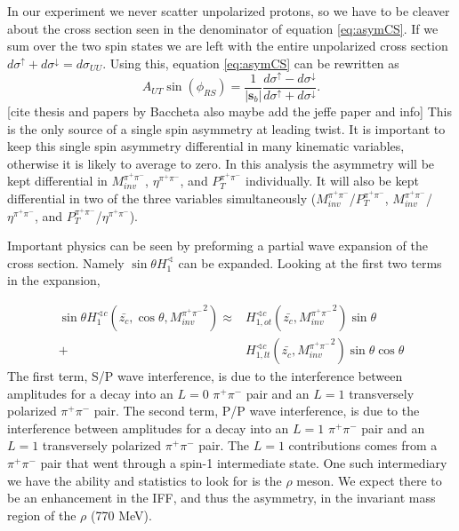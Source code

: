 \documentclass[abstract = on,listof=totoc, bibliography=totoc]{scrreprt}
\newcommand{\phirs}{\phi_{RS}}
\newcommand{\ptpair}{P_{T}^{\pi^+\pi^-}}
\newcommand{\mpair}{M_{inv}^{\pi^+\pi^-}}
\newcommand{\etapair}{\eta^{\pi^+\pi^-}}
\newcommand{\pip}{\pi^+}
\newcommand{\pim}{\pi^-}
\newcommand{\pair}{$\pip\pim$ }
\begin{document}
In our experiment we never scatter unpolarized protons, so we have to be cleaver about the cross section seen in the denominator of equation \ref{eq:asymCS}. If we sum over the two spin states we are left with the entire unpolarized cross section $d\sigma^\uparrow + d\sigma^\downarrow = d\sigma_{UU}$. Using this, equation \ref{eq:asymCS} can be rewritten as 
\begin{equation}
\label{eq:SSA}
A_{UT} \sin (\phirs) =\frac{1}{|\bm{s}_b|} \frac{d\sigma^\uparrow - d\sigma^\downarrow}{d\sigma^\uparrow + d\sigma^\downarrow}.
\end{equation}
[cite thesis and papers by Baccheta also maybe add the jeffe paper and info] 
This is the only source of a single spin asymmetry at leading twist.\cite{bacchettaRadici2} It is important to keep this single spin asymmetry differential in many kinematic variables, otherwise it is likely to average to zero\cite{keepDifferential}. In this analysis the asymmetry will be kept differential in $\mpair$, $\etapair$, and $\ptpair$ individually. It will also be kept differential in two of the three variables simultaneously ($\mpair$/$\ptpair$, $\mpair$/$\etapair$, and $\ptpair$/$\etapair$). 

Important physics can be seen by preforming a partial wave expansion of the cross section\cite{partialWave}. Namely $\sin \theta H_1^\sphericalangle$ can be expanded. Looking at the first two terms in the expansion, 


\begin{align}
\label{eq:partialwaveexpansion}
\sin \theta H_1^{\sphericalangle c} (\bar{z_c},\cos \theta, {\mpair}^2) \approx &H^{\sphericalangle c}_{1,ot}(\bar{z_c},{\mpair}^2) \sin\theta \nonumber \\
+ &H^{\sphericalangle c}_{1,lt}(\bar{z_c},{\mpair}^2) \sin\theta \cos\theta
\end{align}
%
The first term, S/P wave interference, is due to the interference between amplitudes for a decay into an $L = 0$  \pair pair and an $L = 1$ transversely polarized \pair pair. The second term, P/P wave interference, is due to the interference between amplitudes for a decay into an $L = 1$ \pair pair and an $L = 1$ transversely polarized \pair pair. The $L=1$ contributions comes from a \pair pair that went through a spin-1 intermediate state. One such intermediary we have the ability and statistics to look for is the $\rho$ meson. We expect there to be an enhancement in the IFF, and thus the asymmetry, in the invariant mass region of the $\rho$ (770 MeV). \cite{bacchettaRadici2, Tang}    
\end{document}
